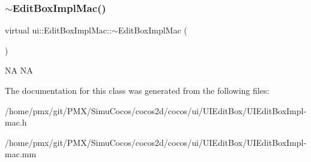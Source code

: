 \subsubsection{\texorpdfstring{$\sim$\+Edit\+Box\+Impl\+Mac()}{~EditBoxImplMac()}\hspace{0.1cm}{\footnotesize\ttfamily [2/2]}}
{\footnotesize\ttfamily virtual ui\+::\+Edit\+Box\+Impl\+Mac\+::$\sim$\+Edit\+Box\+Impl\+Mac (\begin{DoxyParamCaption}{ }\end{DoxyParamCaption})\hspace{0.3cm}{\ttfamily [virtual]}}

NA  NA 

The documentation for this class was generated from the following files\+:\begin{DoxyCompactItemize}
\item 
/home/pmx/git/\+P\+M\+X/\+Simu\+Cocos/cocos2d/cocos/ui/\+U\+I\+Edit\+Box/U\+I\+Edit\+Box\+Impl-\/mac.\+h\item 
/home/pmx/git/\+P\+M\+X/\+Simu\+Cocos/cocos2d/cocos/ui/\+U\+I\+Edit\+Box/U\+I\+Edit\+Box\+Impl-\/mac.\+mm\end{DoxyCompactItemize}
